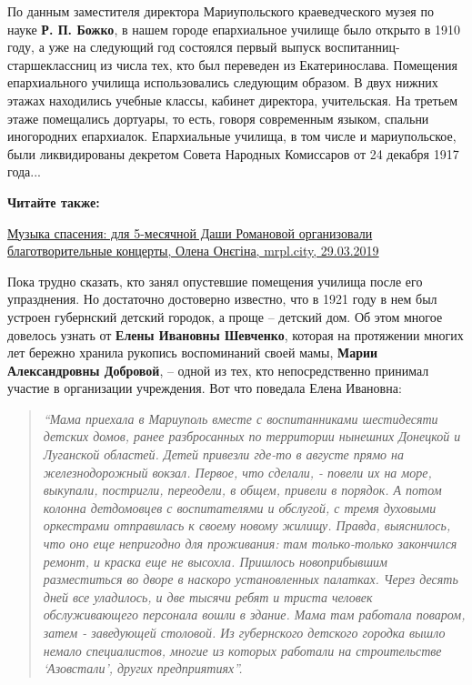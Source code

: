 
По данным заместителя директора Мариупольского краеведческого музея по науке \textbf{Р.
П. Божко}, в нашем городе епархиальное училище было открыто в 1910 году, а уже
на следующий год состоялся первый выпуск воспитанниц-старшеклассниц из числа
тех, кто был переведен из Екатеринослава. Помещения епархиального училища
использовались следующим образом. В двух нижних этажах находились учебные
классы, кабинет директора, учительская. На третьем этаже помещались дортуары,
то есть, говоря современным языком, спальни иногородних епархиалок.
Епархиальные училища, в том числе и мариупольское, были ликвидированы декретом
Совета Народных Комиссаров от 24 декабря 1917 года...


\textbf{Читайте также:} 

\href{https://mrpl.city/news/view/muzyka-spaseniya-dlya-5-mesyachnoj-dashi-romanovoj-organizovali-blagotvoritelnye-kontserty-foto}{%
Музыка спасения: для 5-месячной Даши Романовой организовали благотворительные концерты, Олена Онєгіна, mrpl.city, 29.03.2019}

Пока трудно сказать, кто занял опустевшие помещения училища после его
упразднения. Но достаточно достоверно известно, что в 1921 году в нем был
устроен губернский детский городок, а проще – детский дом. Об этом многое
довелось узнать от \textbf{Елены Ивановны Шевченко}, которая на протяжении многих лет
бережно хранила рукопись воспоминаний своей мамы, \textbf{Марии Александровны Добровой},
– одной из тех, кто непосредственно принимал участие в организации учреждения.
Вот что поведала Елена Ивановна: 

\begin{quote}
\em	
\enquote{Мама приехала в Мариуполь вместе с
воспитанниками шестидесяти детских домов, ранее разбросанных по территории
нынешних Донецкой и Луганской областей. Детей привезли где-то в августе прямо
на железнодорожный вокзал. Первое, что сделали, - повели их на море, выкупали,
постригли, переодели, в общем, привели в порядок. А потом колонна детдомовцев с
воспитателями и обслугой, с тремя духовыми оркестрами отправилась к своему
новому жилищу. Правда, выяснилось, что оно еще непригодно для проживания: там
только-только закончился ремонт, и краска еще не высохла. Пришлось
новоприбывшим разместиться во дворе в наскоро установленных палатках. Через
десять дней все уладилось, и две тысячи ребят и триста человек обслуживающего
персонала вошли в здание. Мама там работала поваром, затем - заведующей
столовой. Из губернского детского городка вышло немало специалистов, многие из
которых работали на строительстве \enquote{Азовстали}, других предприятиях}. 
\end{quote}

